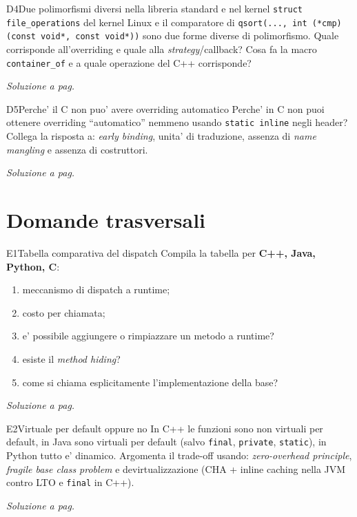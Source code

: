 \documentclass{report}
\newcommand{\code}[1]{\texttt{\small #1}}
\newcommand{\vaisol}[1]{%
    \par\vspace{4pt}\hfill{\footnotesize\itshape\color{gray}%
    Soluzione a pag.~\pageref{sol:#1}}%
}
\begin{document}
\begin{domanda}{D4}{Due polimorfismi diversi nella libreria standard e nel kernel}
\code{struct file\_operations} del kernel Linux e il comparatore di
\code{qsort(..., int (*cmp)(const void*, const void*))} sono due forme diverse
di polimorfismo. Quale corrisponde all'overriding e quale alla
\emph{strategy}/callback? Cosa fa la macro \code{container\_of} e a quale
operazione del C++ corrisponde?
\vaisol{D4}
\end{domanda}

\begin{domanda}{D5}{Perche' il C non puo' avere overriding automatico}
Perche' in C non puoi ottenere overriding ``automatico'' nemmeno usando
\code{static inline} negli header? Collega la risposta a: \emph{early binding},
unita' di traduzione, assenza di \emph{name mangling} e assenza di costruttori.
\vaisol{D5}
\end{domanda}

\chapter{Domande trasversali}\label{ch:trasv}

\begin{domanda}{E1}{Tabella comparativa del dispatch}
Compila la tabella per \textbf{C++, Java, Python, C}:
\begin{enumerate}
    \item[(i)] meccanismo di dispatch a runtime;
    \item[(ii)] costo per chiamata;
    \item[(iii)] e' possibile aggiungere o rimpiazzare un metodo a runtime?
    \item[(iv)] esiste il \emph{method hiding}?
    \item[(v)] come si chiama esplicitamente l'implementazione della base?
\end{enumerate}
\vaisol{E1}
\end{domanda}

\begin{domanda}{E2}{Virtuale per default oppure no}
In C++ le funzioni sono non virtuali per default, in Java sono virtuali per
default (salvo \code{final}, \code{private}, \code{static}), in Python tutto e'
dinamico. Argomenta il trade-off usando: \emph{zero-overhead principle},
\emph{fragile base class problem} e devirtualizzazione (CHA + inline caching
nella JVM contro LTO e \code{final} in C++).
\vaisol{E2}
\end{domanda}
\end{document}
